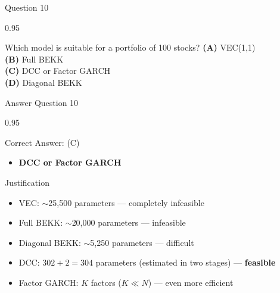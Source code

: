 \documentclass[9pt, aspectratio=169, t]{beamer}
\begin{document}
\begin{frame}{Question 10}
    \begin{cminipage}{0.95\textwidth}
    \begin{block}{Which model is suitable for a portfolio of 100 stocks?}
        \textcolor{MainBlue}{\textbf{(A)}} VEC(1,1)\\[3pt]
        \textcolor{MainBlue}{\textbf{(B)}} Full BEKK\\[3pt]
        \textcolor{MainBlue}{\textbf{(C)}} DCC or Factor GARCH\\[3pt]
        \textcolor{MainBlue}{\textbf{(D)}} Diagonal BEKK
    \end{block}
    \end{cminipage}
\end{frame}

\begin{frame}{Answer Question 10}
    \begin{cminipage}{0.95\textwidth}
    \begin{exampleblock}{Correct Answer: (C)}
        \begin{itemize}\setlength{\itemsep}{0pt}
            \item \textbf{DCC or Factor GARCH}
        \end{itemize}
    \end{exampleblock}

    \pause
    \begin{block}{Justification}
        \begin{itemize}\setlength{\itemsep}{0pt}
            \item VEC: $\sim$25,500 parameters --- completely infeasible
            \item Full BEKK: $\sim$20,000 parameters --- infeasible
            \item Diagonal BEKK: $\sim$5,250 parameters --- difficult
            \item DCC: $302 + 2 = 304$ parameters (estimated in two stages) --- \textbf{feasible}
            \item Factor GARCH: $K$ factors ($K \ll N$) --- even more efficient
        \end{itemize}
    \end{block}
    \end{cminipage}
\end{frame}
\end{document}
